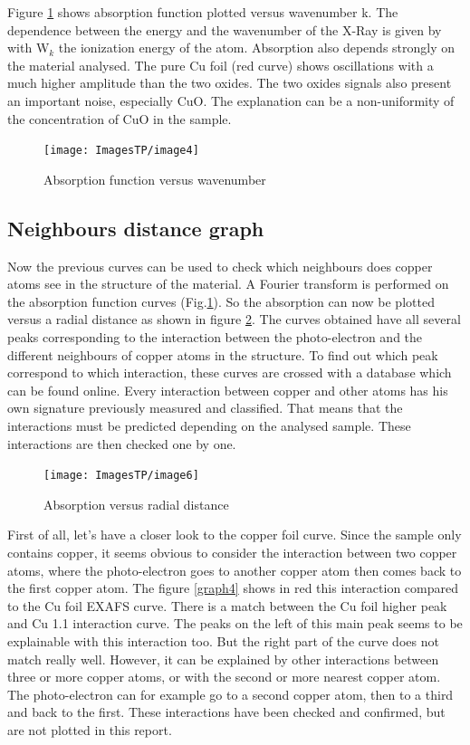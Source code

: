\documentclass[11pt,a4paper,oneside]{report}
\begin{document}
Figure \ref{graph2} shows absorption function plotted versus wavenumber k. The dependence between the energy and the wavenumber of the X-Ray is given by with W$_k$ the ionization energy of the atom.
Absorption also depends strongly on the material analysed. The pure Cu foil (red curve) shows oscillations with a much higher amplitude than the two oxides. The two oxides signals also present an important noise, especially CuO. The explanation can be a non-uniformity of the concentration of CuO in the sample.
\begin{figure}[H]
    \begin{center}
        \texttt{[image: ImagesTP/image4]}
        \caption{Absorption function versus wavenumber}
        \label{graph2}
    \end{center}
\end{figure}

\subsection{Neighbours distance graph}
Now the previous curves can be used to check which neighbours does copper atoms see in the structure of the material. A Fourier transform is performed on the absorption function curves (Fig.\ref{graph2}). So the absorption can now be plotted versus a radial distance as shown in figure \ref{graph3}. The curves obtained have all several peaks corresponding to the interaction between the photo-electron and the different neighbours of copper atoms in the structure. To find out which peak correspond to which interaction, these curves are crossed with a database which can be found online. Every interaction between copper and other atoms has his own signature previously measured and classified. That means that the interactions must be predicted depending on the analysed sample. These interactions are then checked one by one.



\begin{figure}[H]
    \begin{center}
        \texttt{[image: ImagesTP/image6]}
        \caption{Absorption versus radial distance}
        \label{graph3}
    \end{center}
\end{figure}


First of all, let’s have a closer look to the copper foil curve. Since the sample only contains copper, it seems obvious to consider the interaction between two copper atoms, where the photo-electron goes to another copper atom then comes back to the first copper atom. The figure \ref{graph4} shows in red this interaction compared to the Cu foil EXAFS curve. There is a match between the Cu foil higher peak and Cu 1.1 interaction curve. The peaks on the left of this main peak seems to be explainable with this interaction too. But the right part of the curve does not match really well. However, it can be explained by other interactions between three or more copper atoms, or with the second or more nearest copper atom. The photo-electron can for example go to a second copper atom, then to a third and back to the first. These interactions have been checked and confirmed, but are not plotted in this report.
\end{document}
